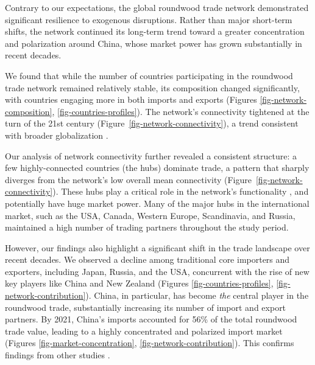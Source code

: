 \documentclass[
  authoryear,
  review,
  3p]{elsarticle}
\begin{document}
Contrary to our expectations, the global roundwood trade network
demonstrated significant resilience to exogenous disruptions. Rather
than major short-term shifts, the network continued its long-term trend
toward a greater concentration and polarization around China, whose
market power has grown substantially in recent decades.

We found that while the number of countries participating in the
roundwood trade network remained relatively stable, its composition
changed significantly, with countries engaging more in both imports and
exports (Figures \ref{fig-network-composition},
\ref{fig-countries-profiles}). The network's connectivity tightened at
the turn of the 21st century (Figure~\ref{fig-network-connectivity}), a
trend consistent with broader globalization \citep{Prestemon2003}.

Our analysis of network connectivity further revealed a consistent
structure: a few highly-connected countries (the hubs) dominate trade, a
pattern that sharply diverges from the network's low overall mean
connectivity (Figure~\ref{fig-network-connectivity}). These hubs play a
critical role in the network's functionality \citep{huang_static_2024},
and potentially have huge market power. Many of the major hubs in the
international market, such as the USA, Canada, Western Europe,
Scandinavia, and Russia, maintained a high number of trading partners
throughout the study period.

However, our findings also highlight a significant shift in the trade
landscape over recent decades. We observed a decline among traditional
core importers and exporters, including Japan, Russia, and the USA,
concurrent with the rise of new key players like China and New Zealand
(Figures \ref{fig-countries-profiles}, \ref{fig-network-contribution}).
China, in particular, has become \emph{the} central player in the
roundwood trade, substantially increasing its number of import and
export partners. By 2021, China's imports accounted for 56\% of the
total roundwood trade value, leading to a highly concentrated and
polarized import market (Figures \ref{fig-market-concentration},
\ref{fig-network-contribution}). This confirms findings from other
studies
\citep{long_exploring_2019, zhou_spatial_2021, shen_structural_2022, huang_static_2024}.
\end{document}
